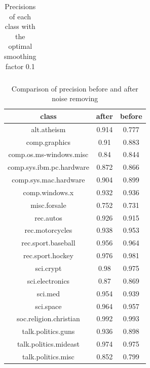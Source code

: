 \documentclass{article}
\begin{document}
\begin{table}[!ht]
\begin{tabular}{ |c|c|c|c|c|c|c|c|c|c|c|c| }
\end{tabular}
\caption{Precisions of each class with the optimal smoothing factor 0.1}
\label{table:result-precisions}
\end{table}

\begin{table}[!ht]
	\centering
	\begin{tabular}{ |c|c|c| }
		\hline
		\textbf{class} & \textbf{after} & \textbf{before} \\
		\hline
		
		alt.atheism & 0.914  & 0.777 \\
		\hline
		comp.graphics & 0.91 & 0.883   \\
		\hline
		comp.os.ms-windows.misc & 0.84 & 0.844  \\
		\hline
		comp.sys.ibm.pc.hardware & 0.872 & 0.866  \\
		\hline
		comp.sys.mac.hardware & 0.904 & 0.899 \\
		\hline
		comp.windows.x & 0.932 & 0.936 \\
		\hline
		misc.forsale & 0.752 & 0.731  \\
		\hline
		rec.autos & 0.926 & 0.915  \\
		\hline
		rec.motorcycles & 0.938 & 0.953  \\
		\hline
		rec.sport.baseball & 0.956 & 0.964 \\
		\hline
		rec.sport.hockey & 0.976 & 0.981  \\
		\hline
		sci.crypt & 0.98 & 0.975 \\
		\hline
		sci.electronics & 0.87 & 0.869  \\
		\hline
		sci.med & 0.954 & 0.939 \\
		\hline
		sci.space & 0.964 & 0.957  \\
		\hline
		soc.religion.christian & 0.992 & 0.993  \\
		\hline
		talk.politics.guns & 0.936 & 0.898  \\
		\hline
		talk.politics.mideast  & 0.974 & 0.975  \\
		\hline
		talk.politics.misc & 0.852 & 0.799  \\
		\hline
		
	\end{tabular}
	\caption{Comparison of precision before and after noise removing}
	\label{table:result-noise-removing}
\end{table}

\newpage


\end{document}
